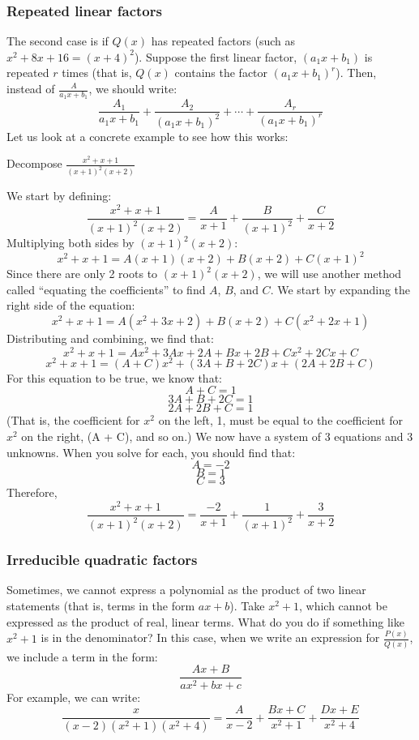 \subsubsection{Repeated linear factors}
The second case is if $Q(x)$ has repeated factors (such as $x^2 + 8x + 16 = (x 
+ 4)^2$). Suppose the first linear factor, $(a_1x + b_1)$ is repeated $r$ 
times (that is, $Q(x)$ contains the factor $(a_1x + b_1)^r$). Then, instead of 
$\frac{A}{a_1x + b_1}$, we should write:
$$\frac{A_1}{a_1x + b_1} + \frac{A_2}{(a_1x + b_1)^2} + \cdots + \frac{A_r}{(
a_1x + b_1)^r}$$
Let us look at a concrete example to see how this works:

\begin{Worked}
\begin{Problem}
Decompose $\frac{x^2 + x + 1}{(x + 1)^2 (x + 2)}$
\end{Problem}
\begin{Solution}
We start by defining:
$$\frac{x^2 + x + 1}{(x + 1)^2 (x + 2)} = \frac{A}{x + 1} + \frac{B}{(x + 1)^
2} + \frac{C}{x + 2}$$
Multiplying both sides by $(x + 1)^2 (x + 2)$:
$$x^2 + x + 1 = A(x + 1)(x + 2) + B(x + 2) + C(x + 1)^2$$
Since there are only 2 roots to $(x + 1)^2 (x + 2)$, we will use another 
method called ``equating the coefficients'' to find $A$, $B$, and $C$. We start 
by expanding the right side of the equation:
$$x^2 + x + 1 = A(x^2 + 3x + 2) + B(x + 2) + C(x^2 + 2x + 1)$$
Distributing and combining, we find that:
$$x^2 + x + 1 = Ax^2 + 3Ax + 2A + Bx + 2B + Cx^2 + 2Cx + C$$
$$x^2 + x + 1 = (A + C)x^2 + (3A + B + 2C)x + (2A + 2B + C)$$
For this equation to be true, we know that:
$$A + C = 1$$
$$3A + B + 2C = 1$$
$$2A + 2B + C = 1$$
(That is, the coefficient for $x^2$ on the left, 1, must be equal to the 
coefficient for $x^2$ on the right, (A + C), and so on.) We now have a system 
of 3 equations and 3 unknowns. When you solve for each, you should find that:
$$A = -2$$
$$B = 1$$
$$C = 3$$
Therefore, 
$$\frac{x^2 + x + 1}{(x + 1)^2 (x + 2)} = \frac{-2}{x + 1} + \frac{1}{(x + 1)^
2} + \frac{3}{x + 2}$$
\end{Solution}
\end{Worked}

\subsubsection{Irreducible quadratic factors}
Sometimes, we cannot express a polynomial as the product of two linear 
statements (that is, terms in the form $ax + b$). Take $x^2 + 1$, which 
cannot be expressed as the product of real, linear terms. What do you do 
if something like $x^2 + 1$ is in the denominator? In this case, when we write an 
expression for $\frac{P(x)}{Q(x)}$, we include a term in the form:
$$\frac{Ax + B}{ax^2 + bx + c}$$
For example, we can write:
$$\frac{x}{(x - 2)(x^2 + 1)(x^2 + 4)} = \frac{A}{x - 2} + \frac{Bx + C}{x^2 + 1} 
+ \frac{Dx + E}{x^2 + 4}$$

